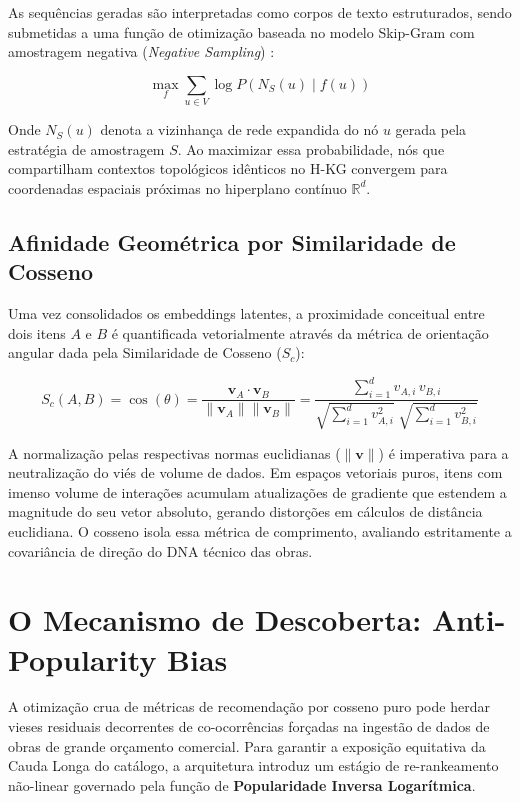 \documentclass[11pt,a4paper]{article}
\begin{document}
As sequências geradas são interpretadas como corpos de texto estruturados, sendo submetidas a uma
função de otimização baseada no modelo Skip-Gram com amostragem negativa
(\textit{Negative Sampling}) \cite{word2vec}:

\begin{equation}
\max_{f} \sum_{u \in V} \log P(N_S(u) \mid f(u))
\end{equation}

Onde $N_S(u)$ denota a vizinhança de rede expandida do nó $u$ gerada pela estratégia de amostragem
$S$. Ao maximizar essa probabilidade, nós que compartilham contextos topológicos idênticos no H-KG
convergem para coordenadas espaciais próximas no hiperplano contínuo $\mathbb{R}^d$.

\subsection{Afinidade Geométrica por Similaridade de Cosseno}

Uma vez consolidados os embeddings latentes, a proximidade conceitual entre dois itens $A$ e $B$
é quantificada vetorialmente através da métrica de orientação angular dada pela Similaridade de
Cosseno ($S_c$):

\begin{equation}
S_c(A, B) = \cos(\theta) = \frac{\mathbf{v}_A \cdot \mathbf{v}_B}{\|\mathbf{v}_A\| \|\mathbf{v}_B\|}
= \frac{\sum_{i=1}^{d} v_{A,i}\, v_{B,i}}%
  {\sqrt{\sum_{i=1}^{d} v_{A,i}^2}\; \sqrt{\sum_{i=1}^{d} v_{B,i}^2}}
\end{equation}

A normalização pelas respectivas normas euclidianas ($\|\mathbf{v}\|$) é imperativa para a
neutralização do viés de volume de dados. Em espaços vetoriais puros, itens com imenso volume de
interações acumulam atualizações de gradiente que estendem a magnitude do seu vetor absoluto,
gerando distorções em cálculos de distância euclidiana. O cosseno isola essa métrica de
comprimento, avaliando estritamente a covariância de direção do DNA técnico das obras.


\section{O Mecanismo de Descoberta: Anti-Popularity Bias}

A otimização crua de métricas de recomendação por cosseno puro pode herdar vieses residuais
decorrentes de co-ocorrências forçadas na ingestão de dados de obras de grande orçamento
comercial. Para garantir a exposição equitativa da Cauda Longa do catálogo, a arquitetura
introduz um estágio de re-rankeamento não-linear governado pela função de \textbf{Popularidade
Inversa Logarítmica}.
\end{document}
